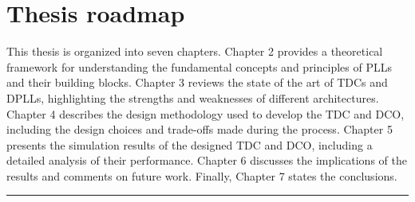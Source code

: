 \section{Thesis roadmap}
This thesis is organized into seven chapters. Chapter 2 provides a theoretical framework for understanding the fundamental concepts and principles of PLLs and their building blocks. Chapter 3 reviews the state of
the art of TDCs and DPLLs, highlighting the strengths and weaknesses of different architectures. Chapter 4 describes the design methodology used to develop the TDC and DCO, including the design choices and
trade-offs made during the process. Chapter 5 presents the simulation results of the designed TDC and DCO, including a detailed analysis of their performance. Chapter 6 discusses the implications of the results
and comments on future work. Finally, Chapter 7 states the conclusions.

\noindent\rule{\textwidth}{1pt}